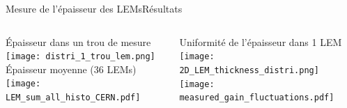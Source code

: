     \begin{frame}{Mesure de l'épaisseur des LEMs}{Résultats}
    	\begin{scriptsize}
    		\begin{columns}
    			\begin{column}{0.48\textwidth}
    				\centering
    				Épaisseur dans un trou de mesure\\
    				\centering
    				\texttt{[image: distri\_1\_trou\_lem.png]}\\
    				\vspace{0.15cm}
    				\centering
    				Épaisseur moyenne (36 LEMs)\\
    				\texttt{[image: LEM\_sum\_all\_histo\_CERN.pdf]}
    			\end{column}
    			\hfill
    			\begin{column}{0.48\textwidth}
    				\centering
    				Uniformité de l'épaisseur dans 1 LEM\\
    				\centering
    				\texttt{[image: 2D\_LEM\_thickness\_distri.png]}\\
    				\vspace{0.15cm}
    				\centering
    				\texttt{[image: measured\_gain\_fluctuations.pdf]}
    			\end{column}
    		\end{columns}
    	\end{scriptsize}
    \end{frame}



